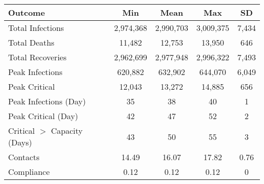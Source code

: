 \begin{table}[ht]
\centering
\begin{tabular}{lcccc}
  \hline
Outcome & Min & Mean & Max & SD \\ 
  \hline
Total Infections & 2,974,368 & 2,990,703 & 3,009,375 & 7,434 \\ 
  Total Deaths &    11,482 &    12,753 &    13,950 &   646 \\ 
  Total Recoveries & 2,962,699 & 2,977,948 & 2,996,322 & 7,493 \\ 
  Peak Infections &   620,882 &   632,902 &   644,070 & 6,049 \\ 
  Peak Critical &    12,043 &    13,272 &    14,885 &   656 \\ 
  Peak Infections (Day) & 35 & 38 & 40 & 1 \\ 
  Peak Critical (Day) & 42 & 47 & 52 & 2 \\ 
  Critical $>$ Capacity (Days) & 43 & 50 & 55 & 3 \\ 
  Contacts & 14.49 & 16.07 & 17.82 & 0.76 \\ 
  Compliance & 0.12 & 0.12 & 0.12 & 0 \\ 
   \hline
\end{tabular}
\end{table}
